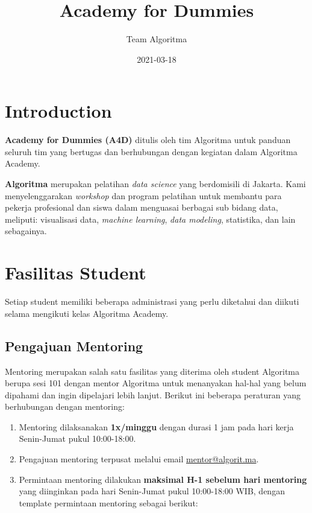 \documentclass[
]{book}
\title{Academy for Dummies}
\author{Team Algoritma}
\date{2021-03-18}
\providecommand{\tightlist}{%
  \setlength{\itemsep}{0pt}\setlength{\parskip}{0pt}}
\begin{document}
\maketitle

{
\setcounter{tocdepth}{1}
\tableofcontents
}
\hypertarget{introduction}{%
\chapter{Introduction}\label{introduction}}

\textbf{Academy for Dummies (A4D)} ditulis oleh tim Algoritma untuk panduan seluruh tim yang bertugas dan berhubungan dengan kegiatan dalam Algoritma Academy.

\textbf{Algoritma} merupakan pelatihan \emph{data science} yang berdomisili di Jakarta. Kami menyelenggarakan \emph{workshop} dan program pelatihan untuk membantu para pekerja profesional dan siswa dalam menguasai berbagai sub bidang data, meliputi: visualisasi data, \emph{machine learning}, \emph{data modeling}, statistika, dan lain sebagainya.

\hypertarget{fasilitas-student}{%
\chapter{Fasilitas Student}\label{fasilitas-student}}

Setiap student memiliki beberapa administrasi yang perlu diketahui dan diikuti selama mengikuti kelas Algoritma Academy.

\hypertarget{pengajuan-mentoring}{%
\section{Pengajuan Mentoring}\label{pengajuan-mentoring}}

Mentoring merupakan salah satu fasilitas yang diterima oleh student Algoritma berupa sesi 101 dengan mentor Algoritma untuk menanyakan hal-hal yang belum dipahami dan ingin dipelajari lebih lanjut. Berikut ini beberapa peraturan yang berhubungan dengan mentoring:

\begin{enumerate}
\def\labelenumi{\arabic{enumi}.}
\tightlist
\item
  Mentoring dilaksanakan \textbf{1x/minggu} dengan durasi 1 jam pada hari kerja Senin-Jumat pukul 10:00-18:00.
\item
  Pengajuan mentoring terpusat melalui email \url{mentor@algorit.ma}.
\item
  Permintaan mentoring dilakukan \textbf{maksimal H-1 sebelum hari mentoring} yang diinginkan pada hari Senin-Jumat pukul 10:00-18:00 WIB, dengan template permintaan mentoring sebagai berikut:
\end{enumerate}
\end{document}
